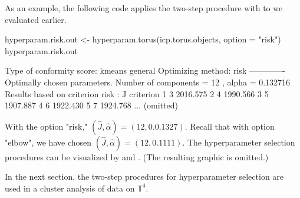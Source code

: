 As an example, the following code applies the two-step procedure with  to  we evaluated earlier.

\begin{example}
hyperparam.risk.out <- hyperparam.torus(icp.torus.objects, option = "risk")
hyperparam.risk.out

Type of conformity score: kmeans general 
Optimizing method: risk 
-------------
Optimally chosen parameters. Number of components =  12 , alpha =  0.132716 
Results based on criterion risk :
    J criterion
1   3  2016.575
2   4  1990.566
3   5  1907.887
4   6  1922.430
5   7  1924.768
... (omitted)
\end{example}

With the option "risk," $(\hat{J}, \hat\alpha) = (12, 0.0.1327)$. 
Recall that with option "elbow", we have chosen $(\hat{J}, \hat\alpha) = (12, 0.1111)$. The hyperparameter selection procedures can be visualized by  and . (The resulting graphic is omitted.)
%

In the next section, the two-step procedures for hyperparameter selection are used in a cluster analysis of data on $\mathbb{T}^4$. 

